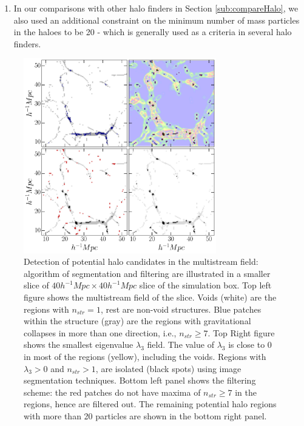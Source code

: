 \documentclass[fleqn,usenatbib,useAMS]{mnras}
\begin{document}
{\begin{enumerate}
\item In our comparisons with other halo finders in Section \ref{sub:compareHalo}, we also used an additional constraint on the minimum number of mass particles in the haloes to be 20 - which is generally used as a criteria in several halo finders. 

\end{enumerate} 


\begin{figure}
\begin{minipage}[t]{0.99\linewidth}
 \centering\includegraphics[height=8.5cm]{fig3.pdf} 
\end{minipage}\hfill
\caption{ Detection of potential halo candidates in the multistream field: algorithm of segmentation and filtering are illustrated in a smaller slice of $40 h^{-1} Mpc \times 40 h^{-1} Mpc$ slice of the simulation box. Top left figure shows the multistream field of the slice. Voids (white) are the regions with $n_{str} =1$, rest are non-void structures. Blue patches within the structure (gray) are the regions with gravitational collapses in more than one direction, i.e., $n_{str} \geq 7$. Top Right figure shows the smallest eigenvalue $\lambda_3$ field. The value of $\lambda_3$ is close to 0 in most of the regions (yellow), including the voids. Regions with  $\lambda_3 > 0$ and $n_{str} > 1$, are isolated (black spots) using image segmentation techniques. Bottom left panel shows the filtering scheme: the red patches do not have maxima of $n_{str} \geq 7$ in the regions, hence are filtered out. The remaining potential halo regions with more than 20 particles are shown in the bottom right panel.}
\label{fig:labelsfilter}
\end{figure}

}
\end{document}
